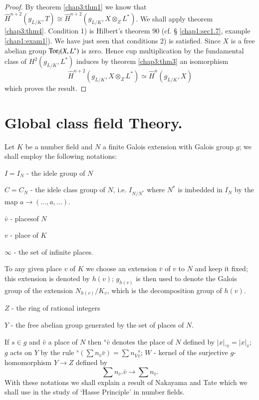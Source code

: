  \begin{proof}
By theorem \ref{chap3:thm1} we know that $\hat{H}^{n+2} (g_{L/K}, T) \cong
\hat{H}^{n+2} (g_{L/K}, X \otimes_Z L^*)$. We shall apply theorem
\ref{chap3:thm4}. Condition 1) is Hilbert's theorem 90 (cf. \S
\ref{chap1:sec1.7}, example 
\ref{chap1:exam1}). We have just seen that conditions 2) is satisfied. Since $X$
is a free abelian group  $\operatorname{Tor}_l(X,L^*)$ is zero. Hence cup
multiplication by the fundamental class of $H^2(g_{L/K}, L^*)$ induces
by theorem \ref{chap3:thm3} an isomorphism  
$$
\hat{H}^{n+2} (g_{L/K}, X \otimes_Z L^*) \simeq \hat{H}^{n} (g_{L/K}, X)
$$
which proves the result.
 \end{proof}


\section{Global class field Theory.}\label{chap3:sec3.3}
 
 Let $K$ be a number field and $N$ a finite Galois extension with
 Galois group $g$; we shall employ the following notations: 
 
 \noindent
 $I = I_N$ - the idele group of $N$
 
 \noindent
 $C = C_N$ - the idele class group of $N$, i.e. $I_{N/N^*}$ where
 $N^*$ is imbedded in $I_N$ by the map $a \rightarrow (\ldots, a,
 \ldots)$. 
 
 \noindent
 $\bar{v}$ - places\pageoriginale of $N$
 
 \noindent
 $v$ - place of $K$
 
 \noindent
 $\infty$ - the set of infinite places.
  
 To any given place $v$ of $K$ we choose an extension $\bar{v}$ of $v$
 to $N$ and keep it fixed; this extension is denoted by $h(v)$;
$g_{h(v)}$ is then used to denote the Galois group of the extension
 $N_{h(v)}/K_v$, which is the decomposition group of $h(v)$. 
 
 \noindent
 $Z$ - the ring of rational integers
 
 \noindent 
 $Y$ - the free abelian group generated by the set of places of $N$.  
 
 \noindent
 If $s \in g$ and $\bar{v}$ a place of $N$ then ${}^s \bar{v}$
 denotes the place of $N$ defined by $|x|_{{}^s\bar{v}} =
 |x|_{\bar{v}}$; $g$ acts on $Y$ by the rule $^s( \sum n_{\bar{v}}
 \bar{v}) = \sum n_{\bar{V}} {}^s_{\bar{v}}$; $W$ - kernel of the
 surjective $g$-homomorphism $Y \rightarrow Z$ defined by  
 $$
\sum n_{\bar{v}}. \bar{v} \rightarrow \sum n_{\bar{v}}.
 $$
 With these notations we shall explain a result of Nakayama and Tate 
 which we shall use in the study of `Hasse Principle' in number
 fields.  
 
